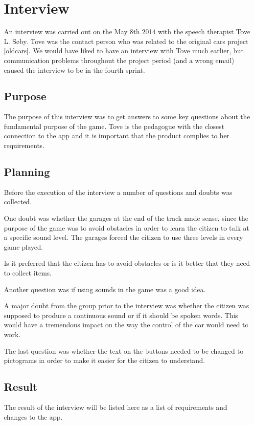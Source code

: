 \section{Interview}

An interview was carried out on the May 8th 2014 with the speech therapist Tove L. Søby.
Tove was the contact person who was related to the original cars project \ref{oldcars}.
We would have liked to have an interview with Tove much earlier, but communication problems throughout the project period (and a wrong email) caused the interview to be in the fourth sprint.

\subsection{Purpose}
The purpose of this interview was to get answers to some key questions about the fundamental purpose of the game. 
Tove is the pedagogue with the closest connection to the app and it is important that the product complies to her requirements.

\subsection{Planning}
Before the execution of the interview a number of questions and doubts was collected.


One doubt was whether the garages at the end of the track made sense, since the purpose of the game was to avoid obstacles in order to learn the citizen to talk at a specific sound level.
The garages forced the citizen to use three levels in every game played.

Is it preferred that the citizen has to avoid obstacles or is it better that they need to collect items. 

Another question was if using sounds in the game was a good idea.

A major doubt from the group prior to the interview was whether the citizen was supposed to produce a continuous sound or if it should be spoken words.
This would have a tremendous impact on the way the control of the car would need to work.

The last question was whether the text on the buttons needed to be changed to pictograms in order to make it easier for the citizen to understand.

\subsection{Result}
The result of the interview will be listed here as a list of requirements and changes to the app.

